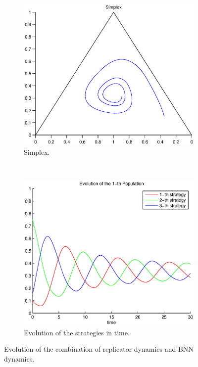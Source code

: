 \documentclass[a4paper,10pt]{article}
\begin{document}
\begin{figure}[h]
  \centering
  \begin{subfigure}[b]{0.4\textwidth}
	  \includegraphics[width=\textwidth]{./images/test_combined.eps}
	  \caption{Simplex.}
	  \label{fig:test_combined_simplex}
  \end{subfigure}
  ~ 
  \begin{subfigure}[b]{0.45\textwidth}
	  \includegraphics[width=\textwidth]{./images/test_combined_ev.eps}
	  \caption{Evolution of the strategies in time.}
	  \label{fig:test_combined_ev}
  \end{subfigure}
  \caption{Evolution of the combination of replicator dynamics and BNN dynamics.}
  \label{fig:rps_combined}
\end{figure}
\end{document}
